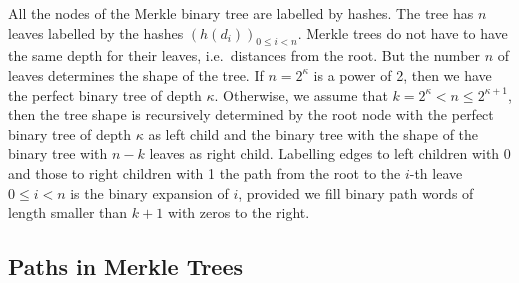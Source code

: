 All the nodes of the Merkle binary tree are labelled by hashes. The tree
has \(n\) leaves labelled by the hashes \((h(d_i))_{0 \le i < n}\).
Merkle trees do not have to have the same depth for their leaves, i.e.\
distances from the root. But the number \(n\) of leaves determines
the shape of the tree. If  \(n = 2^\kappa\) is a power of 2, then 
we have the perfect binary tree of depth \(\kappa\). 
Otherwise, we
assume that \(k=2^\kappa < n \le 2^{\kappa+1}\), then the tree shape is
recursively determined by the root node with the perfect binary
tree of depth \(\kappa\) as left child and the binary tree with
the shape of the binary tree with \(n-k\) leaves as right child.
Labelling edges to left children with 0 and those to right children
with 1 the path from the root to the \(i\)-th leave \(0 \le i < n\)
is the binary expansion of \(i\), provided we fill binary path words 
of length smaller than \(k+1\) with zeros to the right.

\subsection{Paths in Merkle Trees}

